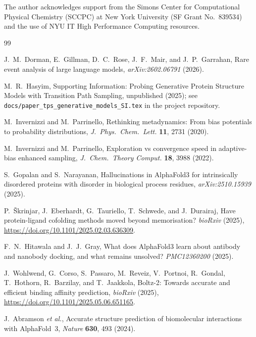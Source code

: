 \documentclass[aps,prl,twocolumn,superscriptaddress,floatfix]{revtex4-2}
\begin{document}
\begin{acknowledgments}
The author acknowledges support from the Simons Center for Computational
Physical Chemistry (SCCPC) at New York University (SF Grant No.~839534) and
the use of NYU IT High Performance Computing resources.
\end{acknowledgments}

\begin{thebibliography}{99}

J.~M.~Dorman, E.~Gillman, D.~C.~Rose, J.~F.~Mair, and J.~P.~Garrahan,
Rare event analysis of large language models,
\textit{arXiv:2602.06791} (2026).

M.~R.~Hasyim,
Supporting Information: Probing Generative Protein Structure Models with
Transition Path Sampling,
unpublished (2025); see \texttt{docs/paper\_tps\_generative\_models\_SI.tex}
in the project repository.

M.~Invernizzi and M.~Parrinello,
Rethinking metadynamics: From bias potentials to probability distributions,
\textit{J.~Phys.~Chem.~Lett.} \textbf{11}, 2731 (2020).

M.~Invernizzi and M.~Parrinello,
Exploration vs convergence speed in adaptive-bias enhanced sampling,
\textit{J.~Chem.~Theory Comput.} \textbf{18}, 3988 (2022).

S.~Gopalan and S.~Narayanan,
Hallucinations in AlphaFold3 for intrinsically disordered proteins with
disorder in biological process residues,
\textit{arXiv:2510.15939} (2025).

P.~\v{S}krinjar, J.~Eberhardt, G.~Tauriello, T.~Schwede, and J.~Durairaj,
Have protein-ligand cofolding methods moved beyond memorisation?
\textit{bioRxiv} (2025), \url{https://doi.org/10.1101/2025.02.03.636309}.

F.~N.~Hitawala and J.~J.~Gray,
What does AlphaFold3 learn about antibody and nanobody docking, and what
remains unsolved?
\textit{PMC12360200} (2025).

J.~Wohlwend, G.~Corso, S.~Passaro, M.~Reveiz, V.~Portnoi, R.~Gondal,
T.~Hothorn, R.~Barzilay, and T.~Jaakkola,
Boltz-2: Towards accurate and efficient binding affinity prediction,
\textit{bioRxiv} (2025), \url{https://doi.org/10.1101/2025.05.06.651165}.

J.~Abramson \textit{et al.},
Accurate structure prediction of biomolecular interactions with AlphaFold~3,
\textit{Nature} \textbf{630}, 493 (2024).


\end{thebibliography}
\end{document}
